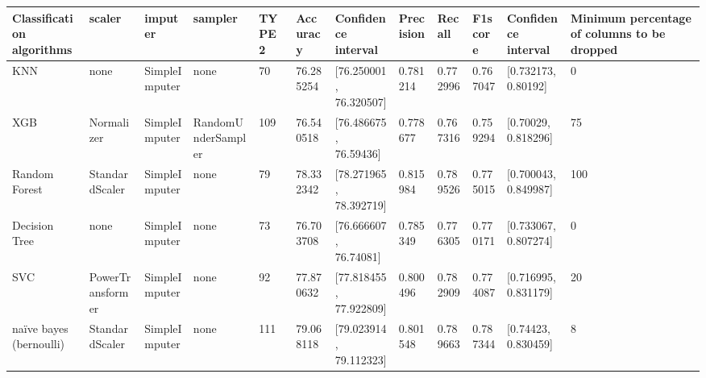 \begin{table}[]
\centering
\begin{tabular}{|l|l|l|l|l|l|l|l|l|l|l|l|}
\hline
\textbf{Classification algorithms} & \textbf{scaler}  & \textbf{imputer} & \textbf{sampler}   & \textbf{TYPE 2} & \textbf{Accuracy} & \textbf{Confidence interval} & \textbf{Precision} & \textbf{Recall} & \textbf{F1score} & \textbf{Confidence interval} & \textbf{Minimum percentage of columns to be dropped} \\ \hline
KNN                                & none             & SimpleImputer    & none               & 70              & 76.285254         & {[}76.250001, 76.320507{]}   & 0.781214           & 0.772996        & 0.767047         & {[}0.732173, 0.80192{]}      & 0                                                    \\ \hline
XGB                                & Normalizer       & SimpleImputer    & RandomUnderSampler & 109             & 76.540518         & {[}76.486675, 76.59436{]}    & 0.778677           & 0.767316        & 0.759294         & {[}0.70029, 0.818296{]}      & 75                                                   \\ \hline
Random Forest                      & StandardScaler   & SimpleImputer    & none               & 79              & 78.332342         & {[}78.271965, 78.392719{]}   & 0.815984           & 0.789526        & 0.775015         & {[}0.700043, 0.849987{]}     & 100                                                  \\ \hline
Decision Tree                      & none             & SimpleImputer    & none               & 73              & 76.703708         & {[}76.666607, 76.74081{]}    & 0.785349           & 0.776305        & 0.770171         & {[}0.733067, 0.807274{]}     & 0                                                    \\ \hline
SVC                                & PowerTransformer & SimpleImputer    & none               & 92              & 77.870632         & {[}77.818455, 77.922809{]}   & 0.800496           & 0.782909        & 0.774087         & {[}0.716995, 0.831179{]}     & 20                                                   \\ \hline
naïve bayes (bernoulli)            & StandardScaler   & SimpleImputer    & none               & 111             & 79.068118         & {[}79.023914, 79.112323{]}   & 0.801548           & 0.789663        & 0.787344         & {[}0.74423, 0.830459{]}      & 8                                                    \\ \hline

\end{tabular}
\end{table}
